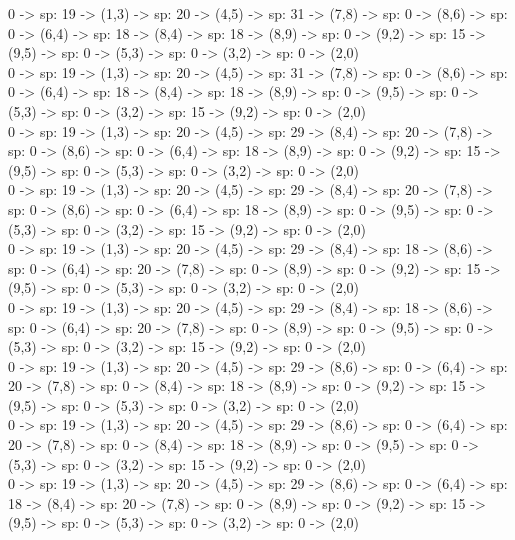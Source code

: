 \documentclass[10pt,a4paper]{article}
\begin{document}
0 -> sp: 19 -> (1,3) -> sp: 20 -> (4,5) -> sp: 31 -> (7,8) -> sp: 0 -> (8,6) -> sp: 0 -> (6,4) -> sp: 18 -> (8,4) -> sp: 18 -> (8,9) -> sp: 0 -> (9,2) -> sp: 15 -> (9,5) -> sp: 0 -> (5,3) -> sp: 0 -> (3,2) -> sp: 0 -> (2,0)\\

0 -> sp: 19 -> (1,3) -> sp: 20 -> (4,5) -> sp: 31 -> (7,8) -> sp: 0 -> (8,6) -> sp: 0 -> (6,4) -> sp: 18 -> (8,4) -> sp: 18 -> (8,9) -> sp: 0 -> (9,5) -> sp: 0 -> (5,3) -> sp: 0 -> (3,2) -> sp: 15 -> (9,2) -> sp: 0 -> (2,0)\\

0 -> sp: 19 -> (1,3) -> sp: 20 -> (4,5) -> sp: 29 -> (8,4) -> sp: 20 -> (7,8) -> sp: 0 -> (8,6) -> sp: 0 -> (6,4) -> sp: 18 -> (8,9) -> sp: 0 -> (9,2) -> sp: 15 -> (9,5) -> sp: 0 -> (5,3) -> sp: 0 -> (3,2) -> sp: 0 -> (2,0)\\

0 -> sp: 19 -> (1,3) -> sp: 20 -> (4,5) -> sp: 29 -> (8,4) -> sp: 20 -> (7,8) -> sp: 0 -> (8,6) -> sp: 0 -> (6,4) -> sp: 18 -> (8,9) -> sp: 0 -> (9,5) -> sp: 0 -> (5,3) -> sp: 0 -> (3,2) -> sp: 15 -> (9,2) -> sp: 0 -> (2,0)\\

0 -> sp: 19 -> (1,3) -> sp: 20 -> (4,5) -> sp: 29 -> (8,4) -> sp: 18 -> (8,6) -> sp: 0 -> (6,4) -> sp: 20 -> (7,8) -> sp: 0 -> (8,9) -> sp: 0 -> (9,2) -> sp: 15 -> (9,5) -> sp: 0 -> (5,3) -> sp: 0 -> (3,2) -> sp: 0 -> (2,0)\\

0 -> sp: 19 -> (1,3) -> sp: 20 -> (4,5) -> sp: 29 -> (8,4) -> sp: 18 -> (8,6) -> sp: 0 -> (6,4) -> sp: 20 -> (7,8) -> sp: 0 -> (8,9) -> sp: 0 -> (9,5) -> sp: 0 -> (5,3) -> sp: 0 -> (3,2) -> sp: 15 -> (9,2) -> sp: 0 -> (2,0)\\

0 -> sp: 19 -> (1,3) -> sp: 20 -> (4,5) -> sp: 29 -> (8,6) -> sp: 0 -> (6,4) -> sp: 20 -> (7,8) -> sp: 0 -> (8,4) -> sp: 18 -> (8,9) -> sp: 0 -> (9,2) -> sp: 15 -> (9,5) -> sp: 0 -> (5,3) -> sp: 0 -> (3,2) -> sp: 0 -> (2,0)\\

0 -> sp: 19 -> (1,3) -> sp: 20 -> (4,5) -> sp: 29 -> (8,6) -> sp: 0 -> (6,4) -> sp: 20 -> (7,8) -> sp: 0 -> (8,4) -> sp: 18 -> (8,9) -> sp: 0 -> (9,5) -> sp: 0 -> (5,3) -> sp: 0 -> (3,2) -> sp: 15 -> (9,2) -> sp: 0 -> (2,0)\\

0 -> sp: 19 -> (1,3) -> sp: 20 -> (4,5) -> sp: 29 -> (8,6) -> sp: 0 -> (6,4) -> sp: 18 -> (8,4) -> sp: 20 -> (7,8) -> sp: 0 -> (8,9) -> sp: 0 -> (9,2) -> sp: 15 -> (9,5) -> sp: 0 -> (5,3) -> sp: 0 -> (3,2) -> sp: 0 -> (2,0)\\
\end{document}

